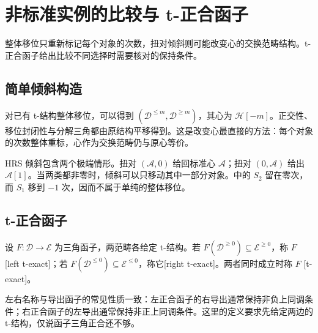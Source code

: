 
\section{非标准实例的比较与 t-正合函子}
\label{b4:sec:1906}

整体移位只重新标记每个对象的次数，扭对倾斜则可能改变心的交换范畴结构。t-正合函子给出比较不同选择时需要核对的保持条件。


%
%
%

\subsection{简单倾斜构造}
\label{b4:subsec:1906:01}

对已有 t-结构整体移位，可以得到 \((\mathcal D^{\le m},\mathcal D^{\ge m})\)，其心为 \(\mathcal H[-m]\)。正交性、移位封闭性与分解三角都由原结构平移得到。这是改变心最直接的方法：每个对象的次数整体重标，心作为交换范畴仍与原心等价。

\ProseParagraphBreak
HRS 倾斜包含两个极端情形。扭对 \((\mathcal A,0)\) 给回标准心 \(\mathcal A\)；扭对 \((0,\mathcal A)\) 给出 \(\mathcal A[1]\)。当两类都非零时，倾斜可以只移动其中一部分对象。中的 \(S_2\) 留在零次，而 \(S_1\) 移到 \(-1\) 次，因而不属于单纯的整体移位。

\subsection{t-正合函子}
\label{b4:subsec:1906:02}

\begin{definition}\label{b4:def:t-exact-functor}
设 \(F:\mathcal D\to\mathcal E\) 为三角函子，两范畴各给定 t-结构。若 \(F(\mathcal D^{\ge0})\subseteq\mathcal E^{\ge0}\)，称 \(F\) [left t-exact]；若 \(F(\mathcal D^{\le0})\subseteq\mathcal E^{\le0}\)，称它[right t-exact]。两者同时成立时称 \(F\) [t-exact]。
\end{definition}

左右名称与导出函子的常见性质一致：左正合函子的右导出通常保持非负上同调条件；右正合函子的左导出通常保持非正上同调条件。这里的定义要求先给定两边的 t-结构，仅说函子三角正合还不够。


